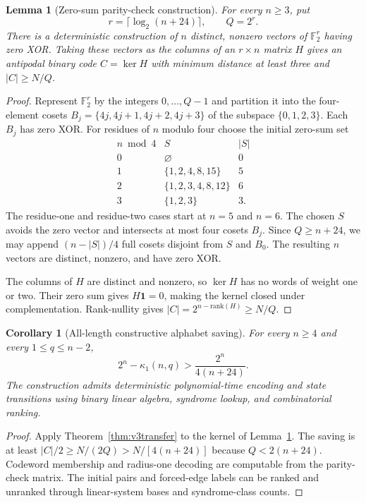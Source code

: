 \documentclass[11pt,a4paper]{article}
\newtheorem{lemma}[theorem]{Lemma}
\newtheorem{corollary}[theorem]{Corollary}
\newcommand{\F}{\mathbb F_2}
\begin{document}
\begin{lemma}[Zero-sum parity-check construction]\label{lem:v3zerosum}
For every $n\ge3$, put
\[
 r=\lceil\log_2(n+24)\rceil,\qquad Q=2^r.
\]
There is a deterministic construction of $n$ distinct, nonzero vectors of $\F^r$ having zero XOR. Taking these vectors as the columns of an $r\times n$ matrix $H$ gives an antipodal binary code $C=\ker H$ with minimum distance at least three and $|C|\ge N/Q$.
\end{lemma}
\begin{proof}
Represent $\F^r$ by the integers $0,\ldots,Q-1$ and partition it into the four-element cosets $B_j=\{4j,4j+1,4j+2,4j+3\}$ of the subspace $\{0,1,2,3\}$. Each $B_j$ has zero XOR. For residues of $n$ modulo four choose the initial zero-sum set
\[
\begin{array}{c|c|c}
n\bmod4&S&|S|\\ \hline
0&\varnothing&0\\
1&\{1,2,4,8,15\}&5\\
2&\{1,2,3,4,8,12\}&6\\
3&\{1,2,3\}&3.
\end{array}
\]
The residue-one and residue-two cases start at $n=5$ and $n=6$. The chosen $S$ avoids the zero vector and intersects at most four cosets $B_j$. Since $Q\ge n+24$, we may append $(n-|S|)/4$ full cosets disjoint from $S$ and $B_0$. The resulting $n$ vectors are distinct, nonzero, and have zero XOR.

The columns of $H$ are distinct and nonzero, so $\ker H$ has no words of weight one or two. Their zero sum gives $H\mathbf1=0$, making the kernel closed under complementation. Rank-nullity gives $|C|=2^{n-\mathrm{rank}(H)}\ge N/Q$.
\end{proof}

\begin{corollary}[All-length constructive alphabet saving]\label{cor:v3all}
For every $n\ge4$ and every $1\le q\le n-2$,
\[
 \boxed{\qquad 2^n-\kappa_1(n,q)>\frac{2^n}{4(n+24)}.\qquad}
\]
The construction admits deterministic polynomial-time encoding and state transitions using binary linear algebra, syndrome lookup, and combinatorial ranking.
\end{corollary}
\begin{proof}
Apply Theorem~\ref{thm:v3transfer} to the kernel of Lemma~\ref{lem:v3zerosum}. The saving is at least $|C|/2\ge N/(2Q)>N/[4(n+24)]$ because $Q<2(n+24)$. Codeword membership and radius-one decoding are computable from the parity-check matrix. The initial pairs and forced-edge labels can be ranked and unranked through linear-system bases and syndrome-class counts.
\end{proof}
\end{document}
